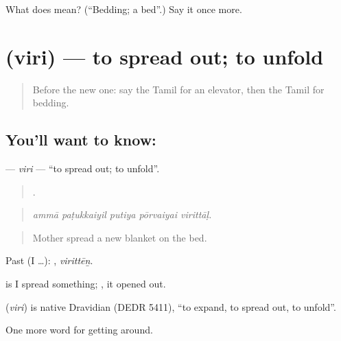 \begin{tcolorbox}[breakable,colback=teal!4,colframe=teal!35!black,title={Before you move on}]
What does  mean? (\textquotedblleft{}Bedding; a bed\textquotedblright{}.) Say it once more.
\end{tcolorbox}
\section[\texorpdfstring{\ta{விரி} (viri)}{விரி (viri)}]{ (viri) — to spread out; to unfold}

\label{lesson:TA-C418-viri}



\begin{quote}
Before the new one: say the Tamil for an elevator, then the Tamil for bedding.
\end{quote}

\subsection*{You'll want to know: }
\textbf{} — \emph{viri} — \textquotedblleft{}to spread out; to unfold\textquotedblright{}.

\begin{quote}
    .
\end{quote}

\begin{quote}
\emph{ammā paṭukkaiyil putiya pōrvaiyai virittāḷ.}
\end{quote}

\begin{quote}
Mother spread a new blanket on the bed.
\end{quote}

Past (I …): , \emph{virittēṉ}.

 is I spread something; , it opened out.

\begin{cousinweb}
\textbf{} (\emph{viri}) is native Dravidian (DEDR 5411), \textquotedblleft{}to expand, to spread out, to unfold\textquotedblright{}.
\end{cousinweb}

\begin{grammarlens}[title={What you've built}]
One more word for getting around.
\end{grammarlens}

